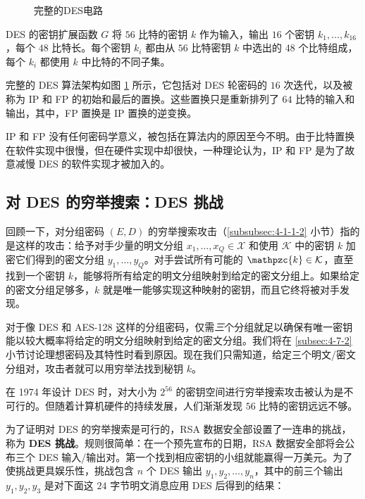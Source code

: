 \begin{figure}
  \centering
  
  \caption{完整的DES电路}
  \label{fig:4-9}
\end{figure}

\begin{snote}[密钥扩展函数。]
DES 的密钥扩展函数 $G$ 将 $56$ 比特的密钥 $k$ 作为输入，输出 $16$ 个密钥 $k_1,\dots,k_{16}$，每个 $48$ 比特长。每个密钥 $k_i$ 都由从 $56$ 比特密钥 $k$ 中选出的 $48$ 个比特组成，每个 $k_i$ 都使用 $k$ 中比特的不同子集。
\end{snote}

\begin{snote}[DES 算法。]
完整的 DES 算法架构如图 \ref{fig:4-9} 所示，它包括对 DES 轮密码的 $16$ 次迭代，以及被称为 IP 和 FP 的初始和最后的置换。这些置换只是重新排列了 $64$ 比特的输入和输出，其中，FP 置换是 IP 置换的逆变换。

IP 和 FP 没有任何密码学意义，被包括在算法内的原因至今不明。由于比特置换在软件实现中很慢，但在硬件实现中却很快，一种理论认为，IP 和 FP 是为了故意减慢 DES 的软件实现才被加入的。
\end{snote}

\subsection{对 DES 的穷举搜索：DES 挑战}\label{subsec:4-2-2}

回顾一下，对分组密码 $(E,D)$ 的穷举搜索攻击（\ref{subsubsec:4-1-1-2} 小节）指的是这样的攻击：给予对手少量的明文分组 $x_1,\dots,x_Q\in\mathcal{X}$ 和使用 $\mathcal{K}$ 中的密钥 $k$ 加密它们得到的密文分组 $y_1,\dots,y_Q$。对手尝试所有可能的 $\mathpzc{k}\in\mathcal{K}$，直至找到一个密钥 $k$，能够将所有给定的明文分组映射到给定的密文分组上。如果给定的密文分组足够多，$k$ 就是唯一能够实现这种映射的密钥，而且它终将被对手发现。

对于像 DES 和 AES-128 这样的分组密码，仅需\emph{三}个分组就足以确保有唯一密钥能以较大概率将给定的明文分组映射到给定的密文分组。我们将在 \ref{subsec:4-7-2} 小节讨论理想密码及其特性时看到原因。现在我们只需知道，给定三个明文/密文分组对，攻击者就可以用穷举法找到秘钥 $k$。

在 1974 年设计 DES 时，对大小为 $2^{56}$ 的密钥空间进行穷举搜索攻击被认为是不可行的。但随着计算机硬件的持续发展，人们渐渐发现 $56$ 比特的密钥远远不够。

为了证明对 DES 的穷举搜索是可行的，RSA 数据安全部设置了一连串的挑战，称为 \textbf{DES 挑战}。规则很简单：在一个预先宣布的日期，RSA 数据安全部将会公布三个 DES 输入/输出对。第一个找到相应密钥的小组就能赢得一万美元。为了使挑战更具娱乐性，挑战包含 $n$ 个 DES 输出 $y_1,y_2,\dots,y_n$，其中的前三个输出 $y_1,y_2,y_3$ 是对下面这 $24$ 字节明文消息应用 DES 后得到的结果：
\begin{figure*}[h!]
  \centering
  
\end{figure*}


